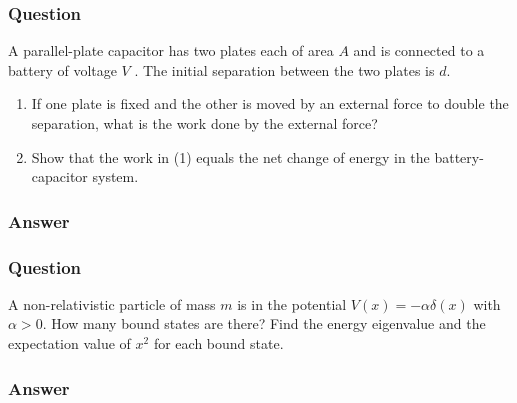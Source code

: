 \subsubsection{Question}
A parallel-plate capacitor has two plates each of area $A$ and is connected to a battery of voltage $V$ . The initial separation between the two plates is $d$.
\begin{enumerate}
	\item If one plate is fixed and the other is moved by an external force to double the separation, what is the work done by the external force?
	\item Show that the work in (1) equals the net change of energy in the battery-capacitor system.
\end{enumerate}
 
\subsubsection{Answer}



\subsubsection{Question}
A non-relativistic particle of mass $m$ is in the potential $V(x) = -\alpha\delta(x)$ with $\alpha> 0$. How many bound states are there? Find the energy eigenvalue and the expectation value of $x^2$ for each bound state.
\subsubsection{Answer}

